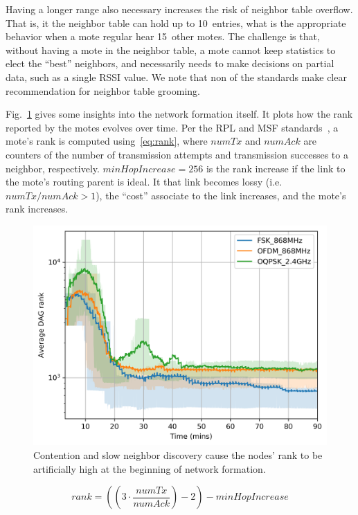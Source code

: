 \documentclass[sensors,article,submit,moreauthors,pdftex]{Definitions/mdpi}
\begin{document}

Having a longer range also necessary increases the risk of neighbor table overflow.
That is, it the neighbor table can hold up to 10~entries, what is the appropriate behavior when a mote regular hear 15~other motes.
The challenge is that, without having a mote in the neighbor table, a mote cannot keep statistics to elect the ``best'' neighbors, and necessarily needs to make decisions on partial data, such as a single RSSI value.
We note that non of the standards make clear recommendation for neighbor table grooming.


Fig.~\ref{fig:dagrank_time} gives some insights into the network formation itself.
It plots how the rank reported by the motes evolves over time.
Per the RPL and MSF standards~\cite{rfc6550,draft-ietf-6tisch-msf}, a mote's rank is computed using~\eqref{eq:rank}, where $numTx$ and $numAck$ are counters of the number of transmission attempts and transmission successes to a neighbor, respectively.
$minHopIncrease = 256$ is the rank increase if the link to the mote's routing parent is ideal.
It that link becomes lossy (i.e.~$numTx/numAck>1$), the ``cost'' associate to the link increases, and the mote's rank increases.

\begin{figure}
	\centering
	\includegraphics[width=0.85\columnwidth]{dagrank_time}
    \caption{Contention and slow neighbor discovery cause the nodes' rank to be artificially high at the beginning of network formation.}
    \label{fig:dagrank_time}
\end{figure}

\begin{equation}
    rank = ((3 \cdot \frac{numTx}{numAck})-2)-minHopIncrease
    \label{eq:rank}
\end{equation}
\end{document}
